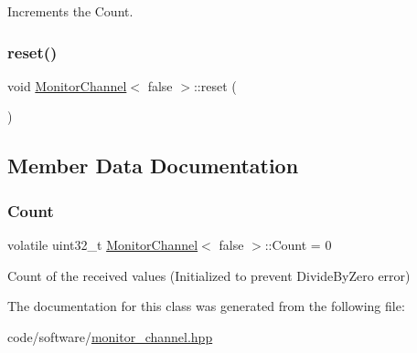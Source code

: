 Increments the {\ttfamily Count}. \mbox{\label{classMonitorChannel_3_01false_01_4_a9310343e280b593894ac370932be4cbe}} 
\subsubsection{\texorpdfstring{reset()}{reset()}}
{\footnotesize\ttfamily void \hyperlink{classMonitorChannel}{Monitor\+Channel}$<$ false $>$\+::reset (\begin{DoxyParamCaption}{ }\end{DoxyParamCaption})\hspace{0.3cm}{\ttfamily [inline]}}



\subsection{Member Data Documentation}
\mbox{\label{classMonitorChannel_3_01false_01_4_a9642a29309b4919130d0fb9573af3a05}} 
\subsubsection{\texorpdfstring{Count}{Count}}
{\footnotesize\ttfamily volatile uint32\+\_\+t \hyperlink{classMonitorChannel}{Monitor\+Channel}$<$ false $>$\+::Count = 0}



Count of the received values (Initialized to prevent Divide\+By\+Zero error) 



The documentation for this class was generated from the following file\+:\begin{DoxyCompactItemize}
\item 
code/software/\hyperlink{monitor__channel_8hpp}{monitor\+\_\+channel.\+hpp}\end{DoxyCompactItemize}
